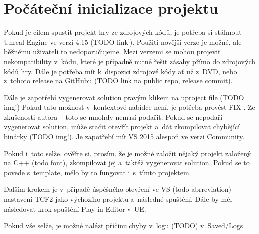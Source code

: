 
\section{Počáteční inicializace projektu}

Pokud je cílem spustit projekt hry ze zdrojových kódů, je potřeba si stáhnout Unreal Engine ve verzi 4.15 (TODO link!). Použití novější verze je možné, ale běžnému uživateli to nedoporučujeme. Mezi verzemi se mohou projevit nekompatibility v~kódu, které je případně nutné řešit zásahy přímo do zdrojových kódů hry.
Dále je potřeba mít k~dispozici zdrojové kódy ať už z~DVD, nebo z~tohoto release na GitHubu (TODO link na public repo, release commit).

Dále je zapotřebí vygenerovat solution pravým klikem na uproject file (TODO img!) Pokud tato možnost v~kontextové nabídce není, je potřeba provést FIX . Ze zkušenosti autora -- toto se mnohdy nemusí podařit. Pokud se nepodaří vygenerovat solution, může stačit otevřít projekt a~dát zkompilovat chybějící binárky (TODO img!). Je zapotřebí mít VS 2015 alespoň ve verzi Community.

Pokud i~toto selže, ověřte si, prosím, že je možné založit nějaký projekt založený na C++ (todo font), zkompilovat jej a~taktéž vygenerovat solution. Pokud se to povede s~template, mělo by to fungovat i~s~tímto projektem.


Dalším krokem je v~případě úspěšného otevření ve VS (todo abrreviation) nastavení TCF2 jako výchozího projektu a~následné spuštění. Dále by měl následovat krok spuštění Play in Editor v~UE.


Pokud vše selže, je možné nalézt příčinu chyby v~logu (TODO) v~Saved/Logs


